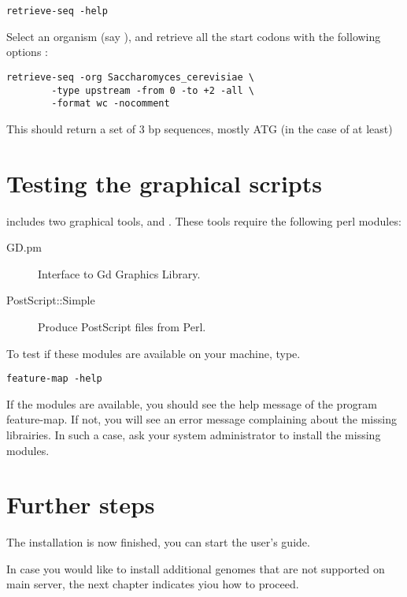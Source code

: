 \documentclass{book}
\begin{document}
\begin{verbatim}
retrieve-seq -help
\end{verbatim}

Select an organism (say ), and
retrieve all the start codons with the following options :

\begin{verbatim}
retrieve-seq -org Saccharomyces_cerevisiae \
        -type upstream -from 0 -to +2 -all \
        -format wc -nocomment
\end{verbatim}

This should return a set of 3 bp sequences, mostly ATG (in the case of
 at least)

\section{Testing the graphical scripts}

\RSAT includes two graphical tools,  and
. These tools require the following  perl modules:

\begin{description}
\item[GD.pm] Interface to Gd Graphics Library.
\item[PostScript::Simple]  Produce PostScript files from Perl.
\end{description}

To test if these modules are available on your machine, type.

\begin{verbatim}
feature-map -help
\end{verbatim}

If the modules are available, you should see the help message of the
program feature-map. If not, you will see an error message complaining
about the missing librairies. In such a case, ask your system
administrator to install the missing modules.

\section{Further steps}

The installation is now finished, you can start the user's guide.

In case you would like to install additional genomes that are not
supported on \RSAT main server, the next chapter indicates yiou how to
proceed.
\end{document}
